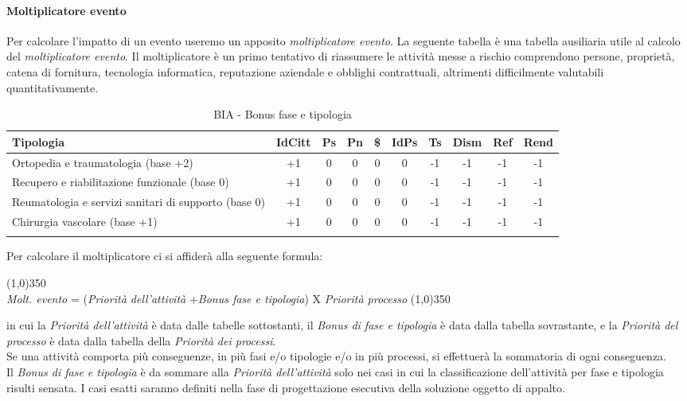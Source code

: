 \newpage
\paragraph{Moltiplicatore evento}
Per calcolare l'impatto di un evento useremo un apposito \textit{moltiplicatore evento}. La seguente tabella è una tabella ausiliaria utile al calcolo del \textit{moltiplicatore evento}. 
Il moltiplicatore è un primo tentativo di riassumere le attività messe a rischio comprendono persone, proprietà, catena di fornitura, tecnologia informatica, reputazione aziendale e obblighi contrattuali, altrimenti difficilmente valutabili quantitativamente.
\renewcommand\arraystretch{1,2}
\begin{longtable}{p{4cm} c c c c c c c c c}
\toprule
\textbf{Tipologia} & IdCitt & Ps & Pn & \$ & IdPs & Ts & Dism & Ref & Rend \\
\toprule
Ortopedia e traumatologia (base +2) & +1 & 0 & 0 & 0 & 0 & -1 & -1 & -1 & -1 \\
Recupero e riabilitazione funzionale (base 0) & +1 & 0 & 0 & 0 & 0 & -1 & -1 & -1 & -1 \\
Reumatologia e servizi sanitari di supporto (base 0) & +1 & 0 & 0 & 0 & 0 & -1 & -1 & -1 & -1 \\
Chirurgia vascolare (base +1) & +1 & 0 & 0 & 0 & 0 & -1 & -1 & -1 & -1 \\
\bottomrule
\caption{BIA - Bonus fase e tipologia}
\end{longtable}

Per calcolare il moltiplicatore ci si affiderà alla seguente formula: 
\begin{center}
	\line(1,0){350}\\
    \vspace{0,1cm}
	\textit{Molt. evento} = (\textit{Priorità dell'attività}
    		+\textit{Bonus fase e tipologia})
            X \textit{Priorità processo}
	\line(1,0){350}
\end{center}
in cui la \textit{Priorità dell'attività} è data dalle tabelle sottostanti, il \textit{Bonus di fase e tipologia} è data dalla tabella sovrastante, e la \textit{Priorità del processo} è data dalla tabella della \textit{Priorità dei processi}.
\\ Se una attività comporta più conseguenze, in più fasi e/o tipologie e/o in più processi, si effettuerà la sommatoria di ogni conseguenza.
\\ Il \textit{Bonus di fase e tipologia} è da sommare alla \textit{Priorità dell'attività} solo nei casi in cui la classificazione dell'attività per fase e tipologia risulti sensata. I casi esatti saranno  definiti nella fase di progettazione esecutiva della soluzione oggetto di appalto. 

